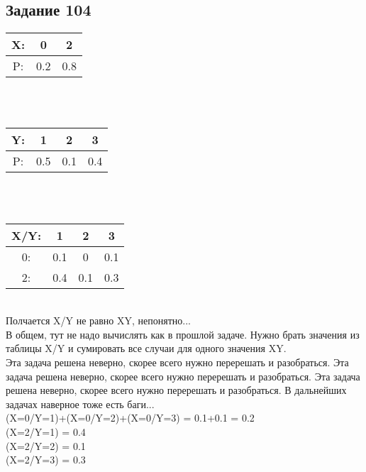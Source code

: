\documentclass[12pt]{article}
\begin{document}
\subsection{Задание 104}
\begin{tabular}{|c|c|c|}
\hline
X: & 0 & 2  \\
\hline
P: & 0.2 & 0.8  \\
\hline
\end{tabular}
\\
\\
\begin{tabular}{|c|c|c|c|}
\hline
Y: & 1 & 2 & 3  \\
\hline
P: & 0.5 & 0.1 & 0.4  \\
\hline
\end{tabular}
\\
\\
\begin{tabular}{|c|c|c|c|}
\hline
X/Y: & 1 & 2 & 3  \\
\hline
0: & 0.1 & 0 & 0.1  \\
\hline
2: & 0.4 & 0.1 & 0.3  \\
\hline
\end{tabular}
\\
Полчается X/Y не равно XY, непонятно...\\
В общем, тут не надо вычислять как в прошлой задаче. Нужно брать значения из таблицы X/Y и сумировать все случаи для одного значения XY.
\\
Эта задача решена неверно, скорее всего нужно перерешать и разобраться.
Эта задача решена неверно, скорее всего нужно перерешать и разобраться.
Эта задача решена неверно, скорее всего нужно перерешать и разобраться.
В дальнейших задачах наверное тоже есть баги...
\\
(X=0/Y=1)+(X=0/Y=2)+(X=0/Y=3) = 0.1+0.1 = 0.2\\
 (X=2/Y=1) = 0.4 \\
(X=2/Y=2) = 0.1 \\
(X=2/Y=3) = 0.3 \\
\\
\newpage
\end{document}
